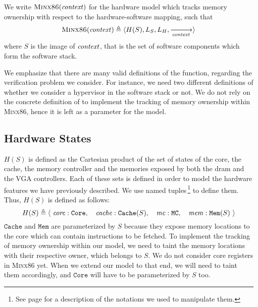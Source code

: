 \begin{definition}
  \label{def:speccert2:minx86}
  We write $\textsc{Minx86}(\mathit{context})$ for the hardware model which
  tracks memory ownership with respect to the  hardware-software
  mapping, such that
%
  \[
    \textsc{Minx86}(\mathit{context}) \triangleq \langle H(S), L_S, L_H,
    \xrightarrow[\mathit{context}]{} \rangle
  \]
  where $S$ is the image of $\mathit{context}$, that is the set of software
  components which form the software stack.
\end{definition}

We emphasize that there are many valid definitions of the  function,
regarding the verification problem we consider.
%
For instance, we need two different definitions of  whether we
consider a hypervisor in the software stack or not.
%
We do not rely on the concrete definition of  to implement the
tracking of memory ownership within {\scshape Minx86}, hence it is left as a
parameter for the model.

\subsection{Hardware States}
\label{subsec:speccert2:state}

$H(S)$ is defined as the Cartesian product of the set of states of the core, the
cache, the memory controller and the memories exposed by both the \ac{dram}
and the VGA controllers.
%
Each of these sets is defined in order to model the hardware features we have
previously described.
%
We use named tuples\,\footnote{See page \pageref{frontmatter:notations} for a
  description of the notations we used to manipulate them.} to
define them.
%
Thus, $H(S)$ is defined as follows:
%
\[
  H(S) \triangleq \left<\ \mathit{core}: \mathtt{Core},\quad\mathit{cache}:
    \mathtt{Cache}(S),\quad\mathit{mc}: \mathtt{MC},\quad\mathit{mem}:
    \mathtt{Mem}(S) \ \right>
\]
%
\( \mathtt{Cache} \) and \( \mathtt{Mem} \) are parameterized by \( S \) because
they expose memory locations to the core which can contain instructions to be
fetched. To implement the tracking of memory ownership within our model, we
need to taint the memory locations with their respective owner, which belongs to \( S \).
%
We do not consider core registers in {\scshape Minx86} yet.
%
When we extend our model to that end, we will need to taint them accordingly,
and \( \mathtt{Core} \) will have to be parameterized by \( S \) too. 

